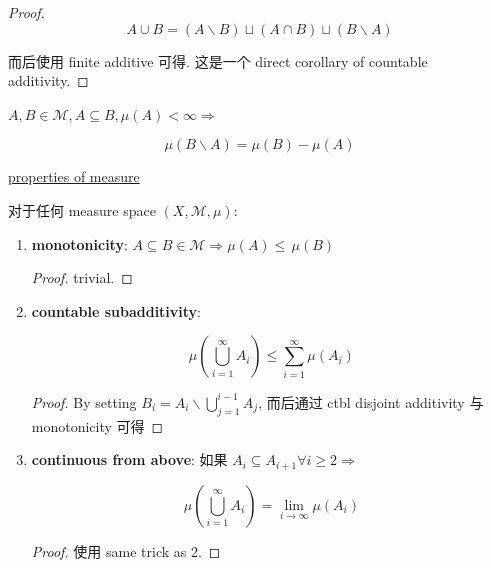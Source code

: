 \documentclass{qlnotes-export}
\begin{document}
\begin{proof}

\[A \cup B = (A\backslash B) \sqcup (A \cap B) \sqcup (B\backslash A)\]

而后使用 finite additive 可得. 这是一个 direct corollary of countable additivity.

\end{proof}

\begin{corollary}

\(A,B \in \mathcal{M},A \subseteq B,\mu(A) < \infty\Longrightarrow\)

\[\mu(B\backslash A) = \mu(B) - \mu(A)\]

\end{corollary}

\begin{theorem}{\href{https://qiulinfan.github.io/notes/math/measure-theory/\#kn-properties-of-measure}{properties
of measure}}

对于任何 measure space \((X,\mathcal{M},\mu)\):

\begin{enumerate}
\item
  \textbf{monotonicity}: \(A \subseteq B \in \mathcal{M}\Longrightarrow\mu(A) \leq \,\mu(B)\)

  \begin{proof}

  trivial.

  \end{proof}
\item
  \textbf{countable subadditivity}:

  \[\mu(\bigcup\limits_{i = 1}^{\infty}A_{i}) \leq \sum\limits_{i = 1}^{\infty}\mu(A_{i})\]

  \begin{proof}

  By setting \(B_{i} = A_{i}\backslash\bigcup_{j = 1}^{i - 1}A_{j}\), 而后通过 ctbl disjoint additivity 与 monotonicity 可得

  \end{proof}
\item
  \textbf{continuous from above}: 如果 \(A_{i} \subseteq A_{i + 1}\forall i \geq 2\Longrightarrow\)

  \[\mu(\bigcup\limits_{i = 1}^{\infty}A_{i}) = \lim\limits_{i\rightarrow\infty}\mu(A_{i})\]

  \begin{proof}

  使用 same trick as 2.


\end{proof}
\end{enumerate}
\end{theorem}
\end{document}
